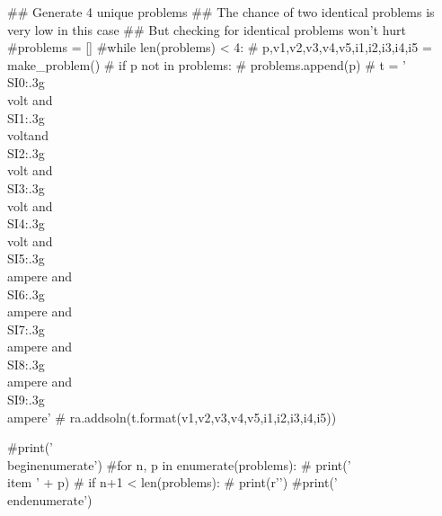 \documentclass[12pt]{exam}
\begin{document}
\begin{questions}
\begin{pycode}
## Generate 4 unique problems
## The chance of two identical problems is very low in this case
## But checking for identical problems won't hurt
#problems = []
#while len(problems) < 4:
#    p,v1,v2,v3,v4,v5,i1,i2,i3,i4,i5 = make_problem()
#    if p not in problems:
#        problems.append(p)
#        t = '\\SI{{{0:.3g}}}{{\\volt}} and \\SI{{{1:.3g}}}{{\\volt}}and \\SI{{{2:.3g}}}{{\\volt}} and \\SI{{{3:.3g}}}{{\\volt}} and \\SI{{{4:.3g}}}{{\\volt}} and \\SI{{{5:.3g}}}{{\\ampere}} and \\SI{{{6:.3g}}}{{\\ampere}} and \\SI{{{7:.3g}}}{{\\ampere}} and \\SI{{{8:.3g}}}{{\\ampere}} and \\SI{{{9:.3g}}}{{\\ampere}}'
#        ra.addsoln(t.format(v1,v2,v3,v4,v5,i1,i2,i3,i4,i5))

#print('\\begin{enumerate}')
#for n, p in enumerate(problems):
#    print('\\item ' + p)
#    if n+1 < len(problems):
#        print(r'\vspace{1in}')
#print('\\end{enumerate}')


\end{pycode}
\end{questions}
\end{document}
